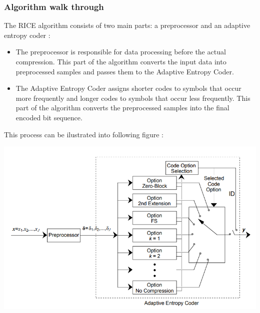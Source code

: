 \documentclass[licencjacka,en]{pracamgr}
\begin{document}
\subsubsection{Algorithm walk through}



The RICE algorithm consists of two main parts: a preprocessor and an adaptive entropy coder \cite{rice-basics}:
\begin{itemize}
\item The preprocessor is responsible for data processing before the actual compression. This part of the algorithm converts the input data into preprocessed samples and passes them to the Adaptive Entropy Coder.
\item The Adaptive Entropy Coder assigns shorter codes to symbols that occur more frequently and longer codes to symbols that occur less frequently. This part of the algorithm converts the preprocessed samples into the final encoded bit sequence.
\end{itemize}

\hfill \break
\hfill \break
\hfill \break
\hfill \break
This process can be ilustrated into following figure \cite{rice-basics}:
\hfill \break
\hfill \break
\centerline{\includegraphics[scale=1.05]{RICE_encoder_architecture}}



\end{document}
